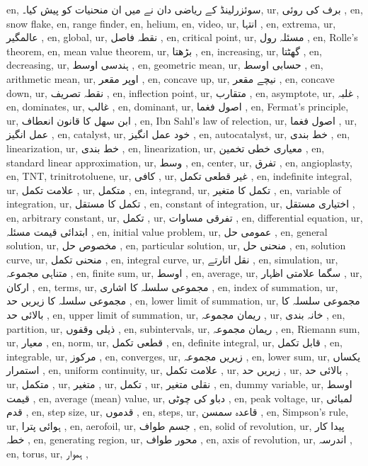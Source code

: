 en, سوئزرلینڈ کے ریاضی دان نے  میں ان منحنیات کو پیش کیا۔,
ur, برف کی روئی ,
en, snow flake,
en, range finder,
en, helium,
en, video,
ur, انتہا ,
en, extrema,
ur, عالمگیر ,
en, global,
ur, نقطہ فاصل ,
en, critical point,
ur, مسئلہ رول ,
en, Rolle's theorem,
en, mean value theorem,
ur, بڑھتا ,
en, increasing,
ur, گھٹتا ,
en, decreasing,
ur, ہندسی اوسط ,
en, geometric mean,
ur, حسابی اوسط ,
en, arithmetic mean,
ur, اوپر مقعر ,
en, concave up,
ur, نیچے مقعر ,
en, concave down,
ur, نقطہ تصریف ,
en, inflection point,
ur, متقارب ,
en, asymptote,
ur, غلبہ ,
en, dominates,
ur, غالب ,
en, dominant,
ur, اصول فغما ,
en, Fermat's principle,
ur, ابن سھل کا قانون انعطاف ,
en, Ibn Sahl's law of relection,
ur, اصول فغما ,
ur, عمل انگیز ,
en, catalyst,
ur, خود عمل انگیز ,
en, autocatalyst,
ur, خط بندی ,
en, linearization,
ur, خط بندی ,
en, linearization,
ur, معیاری خطی تخمین ,
en, standard linear approximation,
ur, وسط ,
en, center,
ur, تفرق ,
en, angioplasty,
en, TNT, trinitrotoluene,
ur, کافی ,
ur, غیر قطعی تکمل ,
en, indefinite integral,
ur, علامت تکمل ,
ur, متکمل ,
en, integrand,
ur, تکمل کا متغیر ,
en, variable of integration,
ur, تکمل کا مستقل ,
en, constant of integration,
ur, اختیاری مستقل ,
en, arbitrary constant,
ur, تکمل ,
ur, تفرقی مساوات ,
en, differential equation,
ur, ابتدائی قیمت مسئلہ ,
en, initial value problem,
ur, عمومی حل ,
en, general solution,
ur, مخصوص حل ,
en, particular solution,
ur, منحنی حل ,
en, solution curve,
ur, منحنی تکمل ,
en, integral curve,
ur, نقل اتارتے ,
en, simulation,
ur, متناہی مجموعہ ,
en, finite sum,
ur, اوسط ,
en, average,
ur, سگما علامتی اظہار ,
ur, ارکان ,
en, terms,
ur, مجموعی سلسلہ کا اشاری ,
en, index of summation,
ur, مجموعی سلسلہ کا زیریں حد ,
en, lower limit of summation,
ur, مجموعی سلسلہ کا بالائی حد ,
en, upper limit of summation,
ur, ریمان مجموعہ ,
ur, خانہ بندی ,
en, partition,
ur, ذیلی وقفوں ,
en, subintervals,
ur, ریمان مجموعہ ,
en, Riemann sum,
ur, معیار ,
en, norm,
ur, قطعی تکمل ,
en, definite integral,
ur, قابل تکمل ,
en, integrable,
ur, مرکوز ,
en, converges,
ur, زیریں مجموعہ ,
en, lower sum,
ur, یکساں استمرار ,
en, uniform continuity,
ur, علامت تکمل ,
ur, زیریں حد ,
ur, بالائی حد ,
ur, متکمل ,
ur, متغیر ,
ur, تکمل ,
ur, نقلی متغیر ,
en, dummy variable,
ur, اوسط قیمت ,
en, average (mean) value,
ur, دباو کی چوٹی ,
en, peak voltage,
ur, لمبائی قدم ,
en, step size,
ur, قدموں ,
en, steps,
ur, قاعدہ سمسن ,
en, Simpson's rule,
ur, ہوائی پترا ,
en, aerofoil,
ur, جسم طواف ,
en, solid of revolution,
ur, پیدا کار خطہ ,
en, generating region,
ur, محور طواف ,
en, axis of revolution,
ur, اندرسہ ,
en, torus,
ur, ہموار ,
